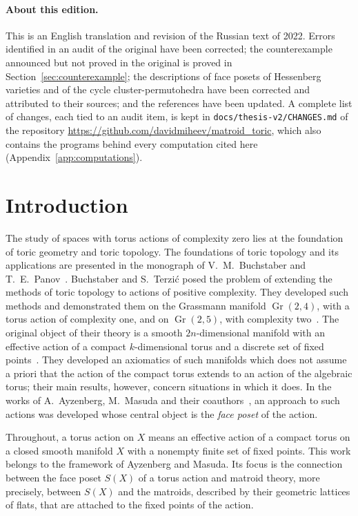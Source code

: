 \documentclass[11pt,a4paper]{article}
\numberwithin{equation}{section}
\theoremstyle{plain}
\theoremstyle{definition}
\theoremstyle{remark}
\DeclareMathOperator{\Gr}{Gr}
\begin{document}
\paragraph{About this edition.}
This is an English translation and revision of the Russian text of 2022. Errors identified in an audit of the original have been corrected; the counterexample announced but not proved in the original is proved in Section~\ref{sec:counterexample}; the descriptions of face posets of Hessenberg varieties and of the cycle cluster-permutohedra have been corrected and attributed to their sources; and the references have been updated. A complete list of changes, each tied to an audit item, is kept in \texttt{docs/thesis-v2/CHANGES.md} of the repository \url{https://github.com/davidmiheev/matroid_toric}, which also contains the programs behind every computation cited here (Appendix~\ref{app:computations}).

\newpage
\tableofcontents
\newpage

\section{Introduction}

The study of spaces with torus actions of complexity zero lies at the foundation of toric geometry and toric topology. The foundations of toric topology and its applications are presented in the monograph of V.~M.~Buchstaber and T.~E.~Panov~\cite{BP15}. Buchstaber and S.~Terzić posed the problem of extending the methods of toric topology to actions of positive complexity. They developed such methods and demonstrated them on the Grassmann manifold $\Gr(2,4)$, with a torus action of complexity one, and on $\Gr(2,5)$, with complexity two~\cite{BT19a,BT19b}. The original object of their theory is a smooth $2n$-dimensional manifold with an effective action of a compact $k$-dimensional torus and a discrete set of fixed points~\cite{BT19b}. They developed an axiomatics of such manifolds which does not assume a priori that the action of the compact torus extends to an action of the algebraic torus; their main results, however, concern situations in which it does. In the works of A.~Ayzenberg, M.~Masuda and their coauthors~\cite{AC22,AMS23,AB24}, an approach to such actions was developed whose central object is the \emph{face poset} of the action.

Throughout, a torus action on $X$ means an effective action of a compact torus on a closed smooth manifold $X$ with a nonempty finite set of fixed points. This work belongs to the framework of Ayzenberg and Masuda. Its focus is the connection between the face poset $S(X)$ of a torus action and matroid theory, more precisely, between $S(X)$ and the matroids, described by their geometric lattices of flats, that are attached to the fixed points of the action.
\end{document}
